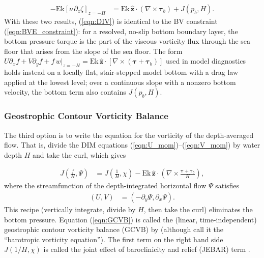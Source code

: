 \documentclass{ametsocV6.2}
\begin{document}
\begin{align}
- \mathrm{Ek} \left[ \nu \, \partial_z \zeta \right]_{z=-H} & = \mathrm{Ek} \, \hat{\mathbf{z}} \cdot \left( \nabla \times \boldsymbol{\tau}_b \right) + J(p_b, H) .
\label{eqn:bottom_vorticity_flux}
\end{align}
With these two results, (\ref{eqn:DIV}) is identical to the BV constraint (\ref{eqn:BVE_constraint}): for a resolved, no-slip bottom boundary layer, the bottom pressure torque is the part of the viscous vorticity flux through the sea floor that arises from the slope of the sea floor.
The form $U \partial_x f + V \partial_y f + f \, w|_{z=-H} = \mathrm{Ek} \, \hat{\mathbf{z}} \cdot \left[ \nabla \times \left( \boldsymbol{\tau} + \boldsymbol{\tau}_b \right) \right]$ used in model diagnostics \citep{waldman&giordani23} holds instead on a locally flat, stair-stepped model bottom with a drag law applied at the lowest level; over a continuous slope with a nonzero bottom velocity, the bottom term also contains $J(p_b, H)$.

\subsubsection{Geostrophic Contour Vorticity Balance}
The third option is to write the equation for the vorticity of the depth-averaged flow.
That is, divide the DIM equations (\ref{eqn:U_mom})--(\ref{eqn:V_mom}) by water depth $H$ and take the curl, which gives

\begin{align}
J\left( \frac{f}{H} , \Psi \right)  & =  J \left( \frac{1}{H}, \chi \right)
- \mathrm{Ek} \, {\hat{\mathbf z}} \cdot \left( \nabla \times \frac{\boldsymbol{\tau} + \boldsymbol{\tau}_b}{H} \right) ,
\label{eqn:GCVB}
\end{align}
where the streamfunction of the depth-integrated horizontal flow $\Psi$ satisfies
\begin{align}
\left( U, V \right) & = \left( -\partial_y \Psi, \partial_x \Psi \right) .
\label{eqn:streamfunction_def}
\end{align}
This recipe (vertically integrate, divide by $H$, then take the curl) eliminates the bottom pressure.
Equation (\ref{eqn:GCVB}) is called the (linear, time-independent) geostrophic contour vorticity balance (GCVB) by \citet{waldman&giordani23} (although \citealt{peterson&callies26} call it the ``barotropic vorticity equation'').
The first term on the right hand side $J(1/H, \chi)$ is called the joint effect of baroclinicity and relief (JEBAR) term \citep{sarkisyan&ivanov71}.
\end{document}
